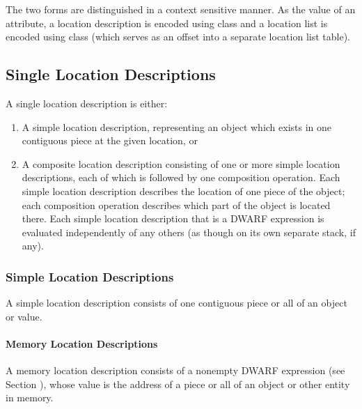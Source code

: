The two forms are distinguished in a context sensitive
manner. As the value of an attribute, a location description
is encoded using 
class   
and a location list is encoded
using class 
(which 
serves as an offset into a
separate 
location list table).


\subsection{Single Location Descriptions}
A single location description is either:

\begin{enumerate}[1]
\item A simple location description, representing an object
which 
exists in one contiguous piece at the given location, or 
\item A composite location description consisting of one or more
simple location descriptions, each of which is followed by
one composition operation. Each simple location description
describes the location of one piece of the object; each
composition operation describes which part of the object is
located there. Each simple location description that is a
DWARF expression is evaluated independently of any others
(as though on its own separate stack, if any). 
\end{enumerate}



\subsubsection{Simple Location Descriptions}

A 
simple location description consists of one 
contiguous piece or all of an object or value.


\paragraph{Memory Location Descriptions}

A 
memory location description 
consists of a non\dash empty DWARF
expression (see 
Section 
), whose value is the address of
a piece or all of an object or other entity in memory.

